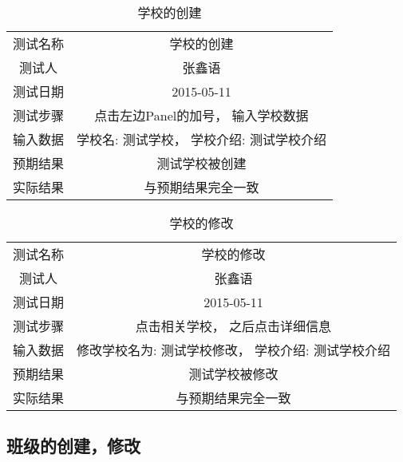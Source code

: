 \begin{table}[H]
  \centering
  \caption{学校的创建}
  \label{tab:1}
  \begin{tabular}{cc}
    \toprule
    测试名称 & 学校的创建  \\

    测试人 & 张鑫语 \\
    测试日期 & 2015-05-11 \\

    \midrule
    测试步骤 		& 点击左边Panel的加号， 输入学校数据 \\
    \midrule
    输入数据 		& 学校名: 测试学校， 学校介绍: 测试学校介绍 \\
    预期结果 		& 测试学校被创建 \\
    实际结果             & 与预期结果完全一致 \\
    \bottomrule
  \end{tabular}
\end{table}


\begin{table}[H]
  \centering
  \caption{学校的修改}
  \label{tab:2}
  \begin{tabular}{cc}
    \toprule
    测试名称 & 学校的修改  \\

    测试人 & 张鑫语 \\
    测试日期 & 2015-05-11 \\

    \midrule
    测试步骤 		& 点击相关学校， 之后点击详细信息 \\
    \midrule
    输入数据 		&  修改学校名为: 测试学校修改， 学校介绍: 测试学校介绍 \\
    预期结果 		& 测试学校被修改 \\
    实际结果             & 与预期结果完全一致 \\
    \bottomrule
  \end{tabular}
\end{table}


\subsection{班级的创建，修改}

